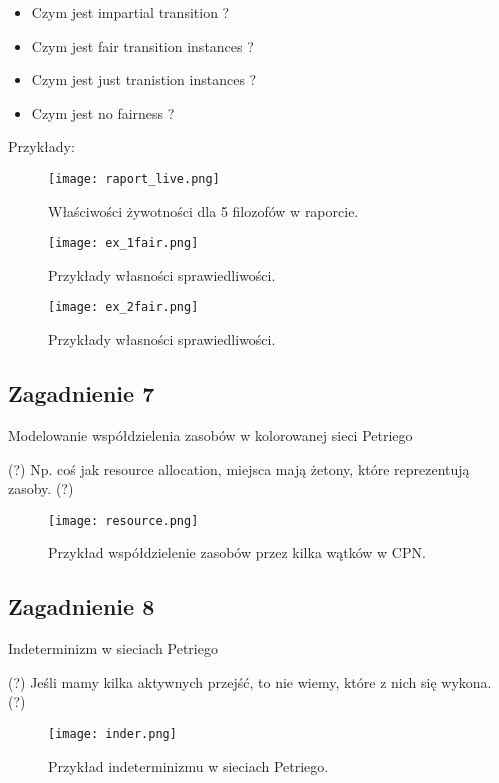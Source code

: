 \documentclass[a4paper,15pt]{article}
\newcommand{\question}[2]{
    \begin{tcolorbox}[colback=black!5!white,colframe=black,title={Zagadnienie #1}]
        #2
    \end{tcolorbox}
}
\begin{document}
\begin{framed}
\begin{itemize}
\item Czym jest impartial transition ?
\item Czym jest fair transition instances ?
\item Czym jest just tranistion instances ?
\item Czym jest no fairness ?
\end{itemize}
\end{framed}

 
Przykłady:
\begin{figure}[H]
\centerline{\texttt{[image: raport\_live.png]}}
\caption{Właściwości żywotności dla 5 filozofów w raporcie.}
\label{fig:raport_bound}
\end{figure}


\begin{figure}[H]
\centerline{\texttt{[image: ex\_1fair.png]}}
\caption{Przykłady własności sprawiedliwości.}
\label{fig:ex_1fair}
\end{figure}

\begin{figure}[H]
\centerline{\texttt{[image: ex\_2fair.png]}}
\caption{Przykłady własności sprawiedliwości.}
\label{fig:ex_2fair}
\end{figure}

\newpage
\subsection{Zagadnienie 7}
\question{7}{
Modelowanie współdzielenia zasobów w kolorowanej sieci Petriego
}

(?) Np. coś jak resource allocation, miejsca mają żetony, które reprezentują zasoby. (?)
\begin{figure}[H]
\centerline{\texttt{[image: resource.png]}}
\caption{Przykład współdzielenie zasobów przez kilka wątków w CPN.}
\label{fig:resource}
\end{figure}

\newpage
\subsection{Zagadnienie 8}
\question{8}{
Indeterminizm w sieciach Petriego
}
(?) Jeśli mamy kilka aktywnych przejść, to nie wiemy, które z nich się wykona. (?)
\begin{figure}[H]
\centerline{\texttt{[image: inder.png]}}
\caption{Przykład indeterminizmu w sieciach Petriego.}
\label{fig:inder}
\end{figure}
\end{document}
